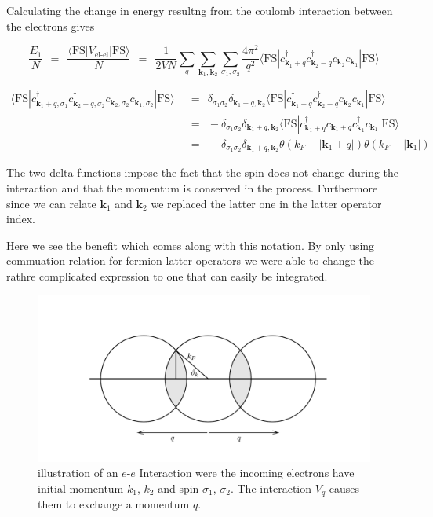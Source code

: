 \documentclass[10pt]{report}
\numberwithin{equation}{chapter}
\begin{document}
Calculating the change in energy resultng from the coulomb interaction between the electrons gives

\begin{equation}
  \frac{E_1}{N} ~~=~~ \frac{\langle \text{FS} | V_\text{el-el} | \text{FS} \rangle}{N} 
  ~~=~~ \frac{1}{2VN} \sum_q \sum_{\mathbf{k}_1, \mathbf{k}_2} \sum_{\sigma_1, \sigma_2}
  \frac{4\pi^2}{q^2} 
  \langle \text{FS} | c^\dag_{\mathbf{k}_1+q} c^\dag_{\mathbf{k}_2-q} c_{\mathbf{k}_2} c_{\mathbf{k}_1} | \text{FS} \rangle  
\end{equation}

\begin{align}
  \langle \text{FS} | c^\dag_{\mathbf{k}_1+q, \sigma_1} c^\dag_{\mathbf{k}_2-q, \sigma_2} c_{\mathbf{k}_2, \sigma_2} c_{\mathbf{k}_1, \sigma_2} | \text{FS} \rangle 
  ~~& =~~ \delta_{\sigma_1 \sigma_2} \delta_{\mathbf{k}_1+q, \mathbf{k}_2} 
  \langle \text{FS} | c^\dag_{\mathbf{k}_1+q} c^\dag_{\mathbf{k}_2-q} c_{\mathbf{k}_2} c_{\mathbf{k}_1} | \text{FS} \rangle \nonumber \\
  ~~& =~~ -\delta_{\sigma_1 \sigma_2} \delta_{\mathbf{k}_1+q, \mathbf{k}_2} 
  \langle \text{FS} | c^\dag_{\mathbf{k}_1+q} c_{\mathbf{k}_1+q} c^\dag_{\mathbf{k}_1} c_{\mathbf{k}_1} | \text{FS} \rangle \nonumber \\
  ~~& =~~ -\delta_{\sigma_1 \sigma_2} \delta_{\mathbf{k}_1+q, \mathbf{k}_2}
  \theta(k_F - |\mathbf{k}_1+q |) \theta(k_F - | \mathbf{k}_1|)
\end{align}


The two delta functions impose the fact that the spin does not change during the interaction and that the momentum is conserved in the process. Furthermore since we can relate $\mathbf{k}_1$ and $\mathbf{k}_2$ we replaced the latter one in the latter operator index.

Here we see the benefit which comes along with this notation. By only using commuation relation for fermion-latter operators we were able to change the rathre complicated expression to one that can easily be integrated.


\begin{figure}
  \centering
  \includegraphics[width=1.0\textwidth]{../img/sq_graph_integration.pdf}
  \caption{illustration of an $e$-$e$ Interaction were the incoming electrons have initial momentum $k_1$, $k_2$ and spin $\sigma_1$, $\sigma_2$. The interaction $V_q$ causes them to exchange a momentum $q$.}
  \label{fig:sq_graph_integration}
\end{figure}
\end{document}
